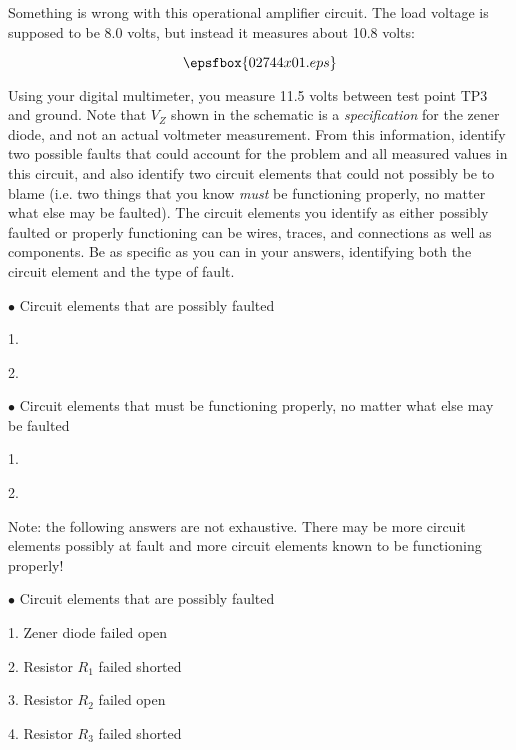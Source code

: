 

Something is wrong with this operational amplifier circuit.  The load voltage is supposed to be 8.0 volts, but instead it measures about 10.8 volts:

$$\epsfbox{02744x01.eps}$$

Using your digital multimeter, you measure 11.5 volts between test point TP3 and ground.  Note that $V_Z$ shown in the schematic is a {\it specification} for the zener diode, and not an actual voltmeter measurement.  From this information, identify two possible faults that could account for the problem and all measured values in this circuit, and also identify two circuit elements that could not possibly be to blame (i.e. two things that you know {\it must} be functioning properly, no matter what else may be faulted).  The circuit elements you identify as either possibly faulted or properly functioning can be wires, traces, and connections as well as components.  Be as specific as you can in your answers, identifying both the circuit element and the type of fault.

\medskip
\item{$\bullet$} Circuit elements that are possibly faulted
\item{1.}
\item{2.} 
\medskip

\medskip
\item{$\bullet$} Circuit elements that must be functioning properly, no matter what else may be faulted
\item{1.} 
\item{2.} 
\medskip







Note: the following answers are not exhaustive.  There may be more circuit elements possibly at fault and more circuit elements known to be functioning properly!

\medskip
\item{$\bullet$} Circuit elements that are possibly faulted
\item{1.} Zener diode failed open
\item{2.} Resistor $R_1$ failed shorted
\item{3.} Resistor $R_2$ failed open
\item{4.} Resistor $R_3$ failed shorted
\medskip

